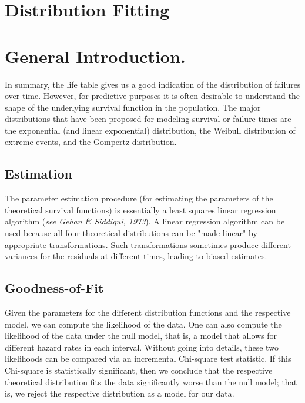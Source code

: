\documentclass[11pt]{article} %
\begin{document}
\section{Distribution Fitting}


\newpage
\section{General Introduction. }
In summary, the life table gives us a good indication of the distribution of failures over time. However, for predictive purposes it is often desirable to understand the shape of the underlying survival function in the population. The major distributions that have been proposed for modeling survival or failure times are the exponential (and linear exponential) distribution, the Weibull distribution of extreme events, and the Gompertz distribution.

\subsection{Estimation} The parameter estimation procedure (for estimating the parameters of the theoretical survival functions) is essentially a least squares linear regression algorithm (\textit{see Gehan \& Siddiqui, 1973}). A linear regression algorithm can be used because all four theoretical distributions can be "made linear" by appropriate transformations. Such transformations sometimes produce different variances for the residuals at different times, leading to biased estimates.

\subsection{Goodness-of-Fit} Given the parameters for the different distribution functions and the respective model, we can compute the likelihood of the data. One can also compute the likelihood of the data under the null model, that is, a model that allows for different hazard rates in each interval. Without going into details, these two likelihoods can be compared via an incremental Chi-square test statistic. If this Chi-square is statistically significant, then we conclude that the respective theoretical distribution fits the data significantly worse than the null model; that is, we reject the respective distribution as a model for our data.
\end{document}
